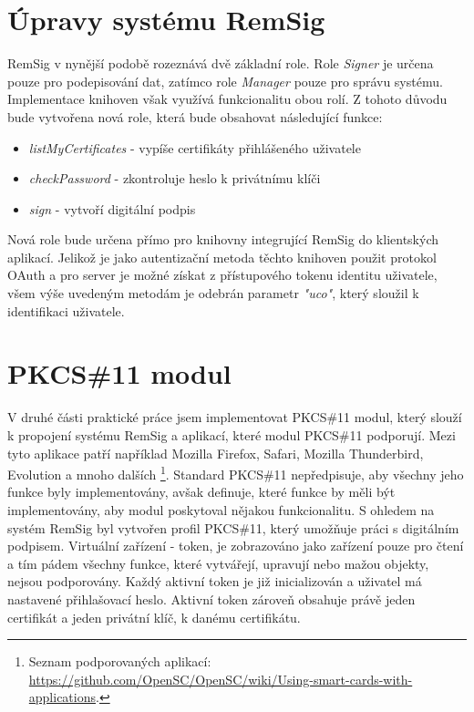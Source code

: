\documentclass[]{fithesis3}
\begin{document}
	\section{Úpravy systému RemSig}

	RemSig v nynější podobě rozeznává dvě základní role. Role \textit{Signer} je určena pouze pro 		podepisování dat, zatímco role \textit{Manager} pouze pro správu systému. Implementace 			knihoven však využívá funkcionalitu obou rolí. Z tohoto důvodu bude vytvořena nová role, 			která bude obsahovat následující funkce:
	\begin{itemize}
		\item \textit{listMyCertificates} - vypíše certifikáty přihlášeného uživatele

		\item \textit{checkPassword} - zkontroluje heslo k privátnímu klíči

		\item \textit{sign} - vytvoří digitální podpis
	\end{itemize}

	Nová role bude určena přímo pro knihovny integrující RemSig do klientských aplikací. Jelikož 		je jako autentizační metoda těchto knihoven použit protokol OAuth a pro server je možné 			získat z přístupového tokenu identitu uživatele, všem výše uvedeným metodám je odebrán 		parametr \textit{"uco"}, který sloužil k identifikaci uživatele.

	\section{PKCS\#11 modul}
	
	V druhé části praktické práce jsem implementovat PKCS\#11 modul, který slouží k propojení 		systému RemSig a aplikací, které modul PKCS\#11 podporují. Mezi tyto aplikace patří například 	Mozilla Firefox, Safari, Mozilla Thunderbird, Evolution a mnoho dalších
\footnote{Seznam podporovaných aplikací: \url{https://github.com/OpenSC/OpenSC/wiki/Using-smart-cards-with-applications}.}. 
	Standard PKCS\#11 nepředpisuje, aby všechny jeho funkce byly implementovány, avšak 			definuje, které funkce by měli být implementovány, aby modul poskytoval nějakou funkcionalitu. S ohledem 	na systém RemSig byl vytvořen profil PKCS\#11, který umožňuje práci s digitálním podpisem. 		Virtuální zařízení - token, je zobrazováno jako zařízení pouze pro čtení a tím pádem všechny 		funkce, které vytvářejí, upravují nebo mažou objekty, nejsou podporovány. Každý aktivní token je 	již inicializován a uživatel má nastavené přihlašovací heslo. Aktivní token zároveň obsahuje 			právě jeden certifikát a jeden privátní klíč, k danému certifikátu.
\end{document}
